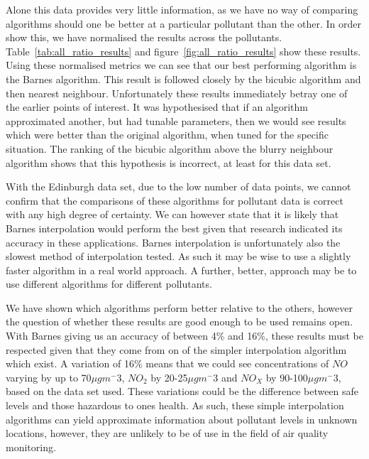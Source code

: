 
		Alone this data provides very little information, as we have no way of comparing algorithms should one be better at a particular pollutant than the other. In order show this, we have normalised the results across the pollutants. Table~\ref{tab:all_ratio_results} and figure~\ref{fig:all_ratio_results} show these results. Using these normalised metrics we can see that our best performing algorithm is the Barnes algorithm. This result is followed closely by the bicubic algorithm and then nearest neighbour. Unfortunately these results immediately betray one of the earlier points of interest. It was hypothesised that if an algorithm approximated another, but had tunable parameters, then we would see results which were better than the original algorithm, when tuned for the specific situation. The ranking of the bicubic algorithm above the blurry neighbour algorithm shows that this hypothesis is incorrect, at least for this data set. 

		With the Edinburgh data set, due to the low number of data points, we cannot confirm that the comparisons of these algorithms for pollutant data is correct with any high degree of certainty. We can however state that it is likely that Barnes interpolation would perform the best given that research indicated its accuracy in these applications. Barnes interpolation is unfortunately also the slowest method of interpolation tested. As such it may be wise to use a slightly faster algorithm in a real world approach. A further, better, approach may be to use different algorithms for different pollutants.

		We have shown which algorithms perform better relative to the others, however the question of whether these results are good enough to be used remains open. With Barnes giving us an accuracy of between 4\% and 16\%, these results must be respected given that they come from on of the simpler interpolation algorithm which exist. A variation of 16\% means that we could see concentrations of $NO$ varying by up to 70$\mu gm^-3$, $NO_{2}$ by 20-25$\mu gm^-3$ and $NO_{X}$ by 90-100$\mu gm^-3$, based on the data set used. These variations could be the difference between safe levels and those hazardous to ones health. As such, these simple interpolation algorithms can yield approximate information about pollutant levels in unknown locations, however, they are unlikely to be of use in the field of air quality monitoring. 
